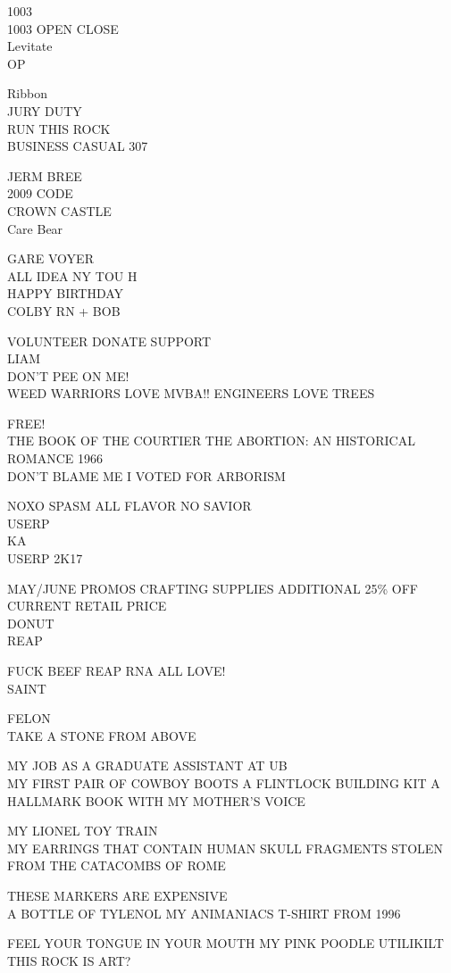 \documentclass[10pt,letterpaper]{article}
\begin{document}
1003\\
1003 OPEN CLOSE\\
Levitate\\
OP

Ribbon\\
JURY DUTY\\
RUN THIS ROCK\\
BUSINESS CASUAL 307

JERM BREE\\
2009 CODE\\
CROWN CASTLE\\
Care Bear

GARE VOYER\\
ALL IDEA NY TOU H\\
HAPPY BIRTHDAY\\
COLBY RN + BOB

VOLUNTEER DONATE SUPPORT\\
LIAM\\
DON'T PEE ON ME!\\
WEED WARRIORS LOVE MVBA!!  ENGINEERS LOVE TREES

FREE!\\
THE BOOK OF THE COURTIER THE ABORTION: AN HISTORICAL ROMANCE 1966\\
DON'T BLAME ME I VOTED FOR ARBORISM

NOXO SPASM ALL FLAVOR NO SAVIOR\\
USERP\\
KA\\
USERP 2K17

MAY/JUNE PROMOS CRAFTING SUPPLIES ADDITIONAL 25\% OFF CURRENT RETAIL PRICE\\
DONUT\\
REAP

FUCK BEEF REAP RNA ALL LOVE!\\
SAINT

FELON\\
TAKE A STONE FROM ABOVE

MY JOB AS A GRADUATE ASSISTANT AT UB\\
MY FIRST PAIR OF COWBOY BOOTS A FLINTLOCK BUILDING KIT A HALLMARK BOOK WITH MY MOTHER'S VOICE

MY LIONEL TOY TRAIN\\
MY EARRINGS THAT CONTAIN HUMAN SKULL FRAGMENTS STOLEN FROM THE CATACOMBS OF ROME

THESE MARKERS ARE EXPENSIVE\\
A BOTTLE OF TYLENOL MY ANIMANIACS T{-}SHIRT FROM 1996

FEEL YOUR TONGUE IN YOUR MOUTH MY PINK POODLE UTILIKILT\\
THIS ROCK IS ART?
\end{document}
